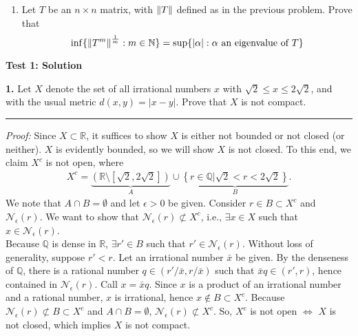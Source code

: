 \documentclass{article}
\begin{document}
\begin{enumerate}
\begin{enumerate}
\end{enumerate}

\item  Let $T$ be an $n \times n$ matrix,  with $\norm{T}$ defined as in the previous problem.   Prove that
$$ \inf \{  \norm{T^m} ^\frac{1}{m} : m \in \mathbb{N} \} = \sup \{ |\alpha| : \alpha \mbox{ an eigenvalue of } T \} $$

\end{enumerate}


\newpage

\begin{center}
	{\Large\bf  Test 1:  Solution}
\end{center}


\noindent \textbf{1.} Let $X$ denote the set of all irrational numbers $x$ with $ \sqrt{2} \leq x \leq 2 \sqrt{2}$,   and with the usual metric $d(x,y) = | x - y |$.  Prove that $X$ is not compact.\\

\hrule
$\,$\\
\noindent \textit{Proof:} Since $X \subset \mathbb{R}$, it suffices to show $X$ is either not bounded or not closed (or neither). $X$ is evidently bounded, so we will show $X$ is not closed. To this end, we claim $X^c$ is not open, where
\begin{align}
X^c = \underbrace{\left(\mathbb{R}\setminus [\sqrt{2}, 2\sqrt{2}]\right)}_{A}\cup \underbrace{\left\{ r\in \mathbb{Q} \vert \sqrt{2} < r < 2\sqrt{2} \right\}}_{B}.
\end{align}
We note that $A \cap B = \emptyset$ and let $\epsilon > 0$ be given. Consider $r\in B \subset X^c$ and $\mathcal{N}_\epsilon(r)$. We want to show that $\mathcal{N}_\epsilon(r) \not\subset X^c$, i.e., $\exists x \in X$ such that $x \in \mathcal{N}_\epsilon(r)$.\\


Because $\mathbb{Q}$ is dense in $\mathbb{R}$, $\exists r' \in B$ such that $ r'\in \mathcal{N}_\epsilon(r)$. Without loss of generality, suppose $r' < r$. Let an irrational number $\bar{x}$ be given. By the denseness of $\mathbb{Q}$, there is a rational number $q\in (r'/\bar{x},r/\bar{x})$ such that $\bar{x}q \in (r',r)$, hence contained in $\mathcal{N}_\epsilon(r)$. Call $x = \bar{x}q$. Since $x$ is a product of an irrational number and a rational number, $x$ is irrational, hence $x\notin B \subset X^c$. Because $\mathcal{N}_\epsilon(r) \not\subset B \subset X^c$ and $A \cap B = \emptyset$, $\mathcal{N}_\epsilon(r) \not\subset X^c$. So, $X^c$ is not open $\iff$ $X$ is not closed, which implies $X$ is not compact. \\
\end{document}
